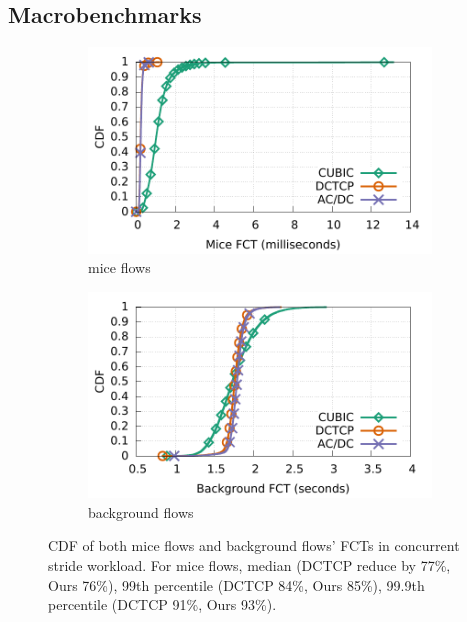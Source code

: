 \subsection{Macrobenchmarks}
\label{macro}

\begin{figure}[t]
        \centering
        \begin{subfigure}[b]{0.45\textwidth}
                \centering
                \includegraphics[width=\textwidth]{figures/macro_benchmarks/macro_4stride/stride4_mice16KB_fct.pdf}
                \caption{mice flows}
                \label{macro_4stride_mice_fct}
        \end{subfigure}
        \begin{subfigure}[b]{0.45\textwidth}
                \centering
                \includegraphics[width=\textwidth]{figures/macro_benchmarks/macro_4stride/stride4_big512MB_fct.pdf}
                \caption{background flows}
                \label{macro_4stride_background_fct}
        \end{subfigure}
        \caption{CDF of both mice flows and background flows' FCTs in concurrent stride workload.
                For mice flows, median (DCTCP reduce by 77\%, Ours 76\%),
                99th percentile (DCTCP 84\%, Ours 85\%),
                99.9th percentile (DCTCP 91\%, Ours 93\%).}
        \label{macro_4stride_fct}
\end{figure}

